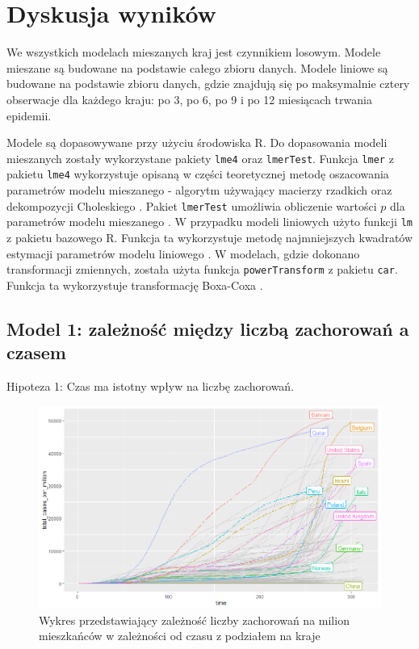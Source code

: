 \documentclass[12pt]{mwbk}
\theoremstyle{plain}
\theoremstyle{definition}
\theoremstyle{remark}
\newcommand\zrodlo[1]{\par\vspace{-3mm}{\small\textit{Źródło: }#1 }}
\begin{document}
\section{Dyskusja wyników}

We wszystkich modelach mieszanych kraj jest czynnikiem losowym. Modele mieszane są budowane na podstawie całego zbioru danych. Modele liniowe są budowane na podstawie zbioru danych, gdzie znajdują się po maksymalnie cztery obserwacje dla każdego kraju: po 3, po 6, po 9 i po 12 miesiącach trwania epidemii.

Modele są dopasowywane przy użyciu środowiska R. Do dopasowania modeli mieszanych zostały wykorzystane pakiety \texttt{lme4} oraz \texttt{lmerTest}. Funkcja \texttt{lmer} z pakietu \texttt{lme4} wykorzystuje opisaną w części teoretycznej metodę oszacowania parametrów modelu mieszanego - algorytm używający macierzy rzadkich oraz dekompozycji Choleskiego \cite{lme4}. Pakiet \texttt{lmerTest} umożliwia obliczenie wartości $p$ dla parametrów modelu mieszanego \cite{lmerTest}. W przypadku modeli liniowych użyto funkcji \texttt{lm} z pakietu bazowego R. Funkcja ta wykorzystuje metodę najmniejszych kwadratów estymacji parametrów modelu liniowego \cite{lm}. W modelach, gdzie dokonano transformacji zmiennych, została użyta funkcja \texttt{powerTransform} z pakietu \texttt{car}. Funkcja ta wykorzystuje transformację Boxa-Coxa \cite{powerTransform}.

\newpage

\subsection{Model 1: zależność między liczbą zachorowań a czasem}

Hipoteza 1: Czas ma istotny wpływ na liczbę zachorowań.

\begin{figure}[htbp]
	\centering
	\includegraphics[width=\linewidth]{rys/total_cases_countries.png}
	\caption{Wykres przedstawiający zależność liczby zachorowań na milion mieszkańców w zależności od czasu z podziałem na kraje}
	\label{fig:total_cases_countries}
	\zrodlo{Opracowanie własne}
\end{figure}
\end{document}

